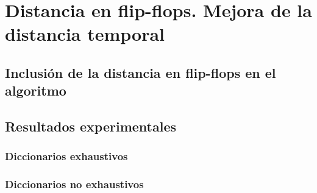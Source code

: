 \chapter{Distancia en flip-flops. Mejora de la distancia temporal}
\label{ch:FFdist}

\lettrine[lraise=-0.1, lines=2, loversize=0.2]{}{}


\section{Inclusión de la distancia en flip-flops en el algoritmo}
\label{sec:FusionFF}


\section{Resultados experimentales}
\label{sec:FFResults}


\subsection{Diccionarios exhaustivos}
\label{subsec:FFDicExhaust}


\subsection{Diccionarios no exhaustivos}
\label{subsec:FFDicNoExhaust}




\endinput
